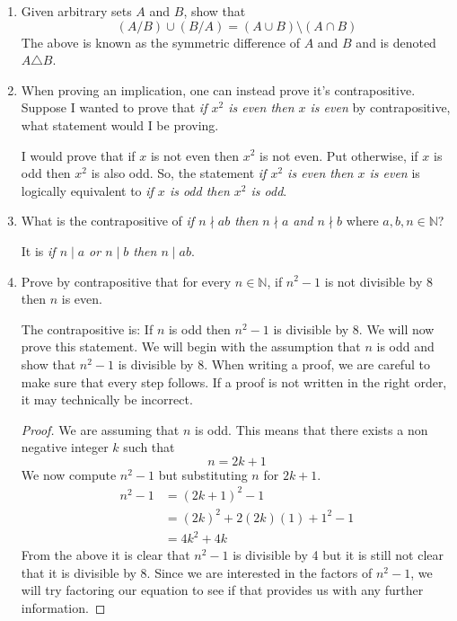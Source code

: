\documentclass[12pt, reqno]{article}
\numberwithin{equation}{section}
\theoremstyle{definition}
\theoremstyle{remark}
\newcommand{\NN}{\mathbb{N}}
\begin{document}
\begin{enumerate}[leftmargin=*]
	\item Given arbitrary sets $A$ and $B$, show that
	      \[
		      (A/B)\cup (B/A) = (A\cup B) \setminus (A\cap B)
	      \]
	      The above is known as the symmetric difference of $A$ and $B$ and is denoted $A\triangle B$.

	\item When proving an implication, one can instead prove it's contrapositive. Suppose I wanted to prove that \emph{if $x^2$ is even then $x$ is even} by contrapositive, what statement would I be proving.

	      I would prove that if $x$ is not even then $x^2$ is not even. Put otherwise, if $x$ is odd then $x^2$ is also odd. So, the statement \emph{if $x^2$ is even then $x$ is even} is logically equivalent to \emph{if $x$ is odd then $x^2$ is odd}.

	\item What is the contrapositive of \emph{if $n\nmid ab$ then $n\nmid a$ and $n\nmid b$} where $a,b,n \in \NN$?

	      It is \emph{if $n\mid a$ or $n\mid b$ then $n\mid ab$}.

	\item Prove by contrapositive that for every $n\in \NN$, if $n^2 - 1$ is not divisible by 8 then $n$ is even.

	      The contrapositive is: If $n$ is odd then $n^2 - 1$ is divisible by 8.
	      We will now prove this statement. We will begin with the assumption that $n$ is odd and show that $n^2-1$ is divisible by 8. When writing a proof, we are careful to make sure that every step follows. If a proof is not written in the right order, it may technically be incorrect.
	      \begin{proof}
		      We are assuming that $n$ is odd. This means that there exists a non negative integer $k$ such that
		      \[
			      n = 2k+1
		      \]
		      We now compute $n^2-1$ but substituting $n$ for $2k+1$.
		      \begin{align*}
			      n^2 - 1 & = \left(2k+1\right)^2 - 1               \\
			              & =\left(2k\right)^2 + 2(2k)(1) + 1^2 - 1 \\
			              & =4k^2 + 4k
		      \end{align*}
		      From the above it is clear that $n^2-1$ is divisible by 4 but it is still not clear that it is divisible by 8. Since we are interested in the factors of $n^2-1$, we will try factoring our equation to see if that provides us with any further information.


\end{proof}
\end{enumerate}
\end{document}
